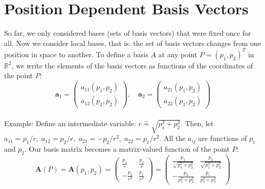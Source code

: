 \section{Position Dependent Basis Vectors}
So far, we only considered bases (sets of basis vectors) that were fixed once for all. Now we consider local bases, that is: the set of basis vectors changes from one position in space to another. To define a basis $A$ at any point $P = (p_1, p_2)^T$ in $\mathbb{R}^2$, we write the elements of the basis vectors as functions of the coordinates of the point $P$:
\begin{equation}
 \mathbf{a}_1 
 =
 \begin{pmatrix} 
  a_{11}(p_1, p_2) \\
  a_{12}(p_1, p_2)
 \end{pmatrix}, \quad
 \mathbf{a}_2 
 =
 \begin{pmatrix} 
  a_{21}(p_1, p_2) \\
  a_{22}(p_1, p_2)
 \end{pmatrix}
\end{equation}

\footnotesize
\paragraph{}Example:
Define an intermediate variable: $r \hat{=} \sqrt{p_1^2 + p_2^2}$. Then, let $a_{11} = p_1/r, \; a_{12} = p_2/r, \; a_{21} = -p_2/r^2, \; a_{22} = p_1/r^2$. All the $a_{ij}$ are functions of $p_1$ and $p_2$. Our basis matrix becomes a matrix-valued function of the point $P$:
\begin{equation}
 \mathbf{A}(P) = \mathbf{A}(p_1, p_2) 
 =
 \begin{pmatrix} 
   \frac{p_1}{r  } & \frac{p_2}{r  } \\
  -\frac{p_2}{r^2} & \frac{p_1}{r^2}
 \end{pmatrix}  
 =
 \begin{pmatrix} 
   \frac{p_1}{\sqrt{p_1^2+p_2^2}} & \frac{p_2}{\sqrt{p_1^2+p_2^2}} \\
  -\frac{p_2}{      p_1^2+p_2^2 } & \frac{p_1}{      p_1^2+p_2^2 }
 \end{pmatrix}
\end{equation}
\normalsize



